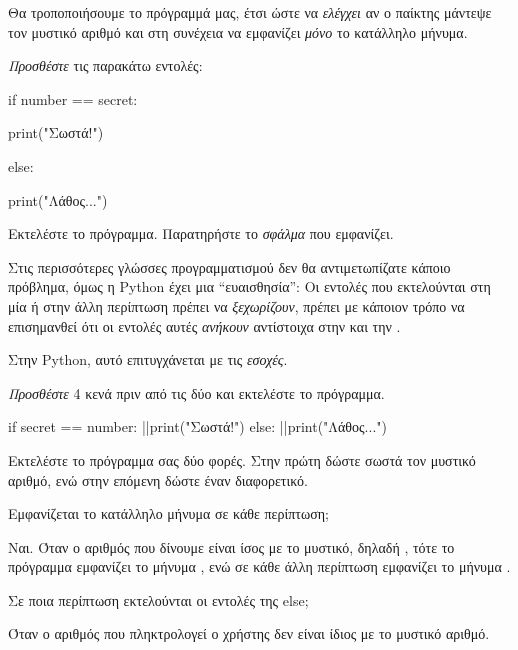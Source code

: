 \documentclass[a4paper,11pt,oneside]{book}
\begin{document}
\begin{step}
Θα τροποποιήσουμε το πρόγραμμά μας, έτσι ώστε να \emph{ελέγχει} αν ο παίκτης μάντεψε τον μυστικό αριθμό και στη συνέχεια να εμφανίζει \emph{μόνο} το κατάλληλο μήνυμα.

\emph{Προσθέστε} τις παρακάτω εντολές:

\begin{pynew}
if number == secret:
\end{pynew}
\begin{pyplain}
print("Σωστά!")
\end{pyplain}
\begin{pynew}
else:
\end{pynew}
\begin{pyplain}
print("Λάθος...")
\end{pyplain}

\marginnote[14pt]{\iconcaution}
Εκτελέστε το πρόγραμμα. Παρατηρήστε το \emph{σφάλμα} που εμφανίζει.

Στις περισσότερες γλώσσες προγραμματισμού δεν θα αντιμετωπίζατε κάποιο πρόβλημα, όμως η Python έχει μια ``ευαισθησία'': Οι εντολές που εκτελούνται στη μία ή στην άλλη περίπτωση πρέπει να \emph{ξεχωρίζουν}, πρέπει με κάποιον τρόπο να επισημανθεί ότι οι εντολές αυτές \emph{ανήκουν} αντίστοιχα στην  και την . 

Στην Python, αυτό επιτυγχάνεται με τις \emph{εσοχές}.
\end{step}

\begin{step}
\emph{Προσθέστε} 4 κενά πριν από τις δύο  και εκτελέστε το πρόγραμμα.

\begin{pyplain}
if secret == number:
|\pyhighlight{\vphantom{λρ}    }|print("Σωστά!")
else:
|\pyhighlight{\vphantom{λρ}    }|print("Λάθος...")
\end{pyplain}

Εκτελέστε το πρόγραμμα σας δύο φορές. Στην πρώτη δώστε σωστά τον μυστικό αριθμό, ενώ στην επόμενη δώστε έναν διαφορετικό.

Εμφανίζεται το κατάλληλο μήνυμα σε κάθε περίπτωση;

\begin{answer}
	Ναι. Όταν ο αριθμός που δίνουμε είναι ίσος με το μυστικό, δηλαδή , τότε το πρόγραμμα εμφανίζει το μήνυμα , ενώ σε κάθε άλλη περίπτωση εμφανίζει το μήνυμα .
\end{answer}

Σε ποια περίπτωση εκτελούνται οι εντολές της else;

\begin{answer}
	Όταν ο αριθμός που πληκτρολογεί ο χρήστης δεν είναι ίδιος με το μυστικό αριθμό.
\end{answer}
\end{step}
\end{document}
